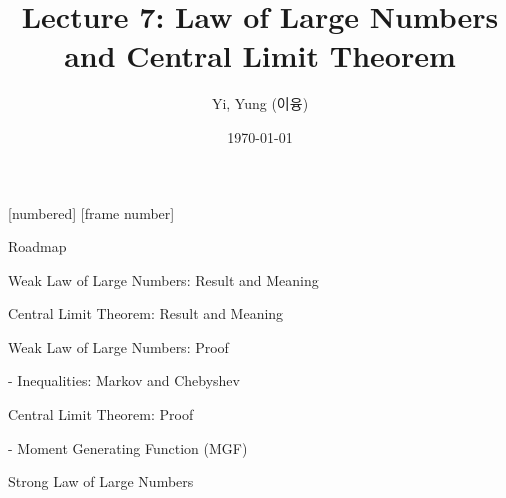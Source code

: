 

\csname\pdfmode\endcsname

{
  [numbered]
  [frame number]  %
}



\title[]{Lecture 7: Law of Large Numbers and Central Limit Theorem}
\author{Yi, Yung (이융)}
\date{\today}








\begin{frame}
  \titlepage
\end{frame}





\begin{frame}{Roadmap}

\plitemsep 0.15in

\bce[(1)]

\item Weak Law of Large Numbers: Result and Meaning
\item Central Limit Theorem: Result and Meaning
\item Weak Law of Large Numbers: Proof

- Inequalities: Markov and Chebyshev

\item Central Limit Theorem: Proof

- Moment Generating Function (MGF)

\item Strong Law of Large Numbers
\ece

\end{frame}

